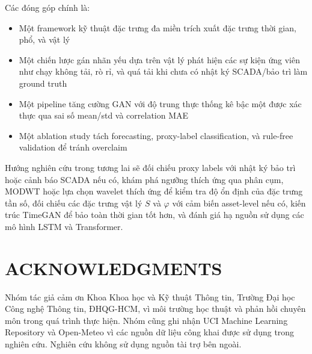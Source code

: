 \documentclass[conference]{IEEEtran}
\begin{document}
Các đóng góp chính là:
\begin{itemize}
\item Một framework kỹ thuật đặc trưng đa miền trích xuất đặc trưng thời gian, phổ, và vật lý
\item Một chiến lược gán nhãn yếu dựa trên vật lý phát hiện các sự kiện ứng viên như chạy không tải, rò rỉ, và quá tải khi chưa có nhật ký SCADA/bảo trì làm ground truth
\item Một pipeline tăng cường GAN với độ trung thực thống kê bậc một được xác thực qua sai số mean/std và correlation MAE
\item Một ablation study tách forecasting, proxy-label classification, và rule-free validation để tránh overclaim
\end{itemize}

Hướng nghiên cứu trong tương lai sẽ đối chiếu proxy labels với nhật ký bảo trì hoặc cảnh báo SCADA nếu có,
khám phá ngưỡng thích ứng qua phân cụm,
MODWT hoặc lựa chọn wavelet thích ứng để kiểm tra độ ổn định của đặc trưng tần số,
đối chiếu các đặc trưng vật lý $S$ và $\varphi$ với cảm biến asset-level nếu có,
kiến trúc TimeGAN để bảo toàn thời gian tốt hơn,
và đánh giá hạ nguồn sử dụng các mô hình LSTM và Transformer.


\section*{ACKNOWLEDGMENTS}

Nhóm tác giả cảm ơn Khoa Khoa học và Kỹ thuật Thông tin, Trường Đại học Công nghệ Thông tin, ĐHQG-HCM, vì môi trường học thuật và phản hồi chuyên môn trong quá trình thực hiện. Nhóm cũng ghi nhận UCI Machine Learning Repository và Open-Meteo vì các nguồn dữ liệu công khai được sử dụng trong nghiên cứu. Nghiên cứu không sử dụng nguồn tài trợ bên ngoài.
\end{document}
